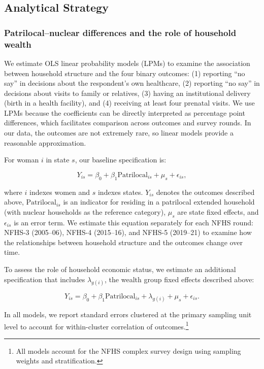 \documentclass[10pt,twoside,reqno]{article}
\begin{document}
\subsection{Analytical Strategy}
\subsubsection{Patrilocal–nuclear differences and the role of household wealth}

We estimate OLS linear probability models (LPMs) to examine the association between household structure and the four binary outcomes: (1) reporting ``no say'' in decisions about the respondent's own healthcare, (2) reporting ``no say'' in decisions about visits to family or relatives, (3) having an institutional delivery (birth in a health facility), and (4) receiving at least four prenatal visits. We use LPMs because the coefficients can be directly interpreted as percentage point differences, which facilitates comparison across outcomes and survey rounds. In our data, the outcomes are not extremely rare, so linear models provide a reasonable approximation.

For woman $i$ in state $s$, our baseline specification is:

\begin{equation} \label{eq:nocontrols}
Y_{is} = \beta_0 + \beta_1 \text{Patrilocal}_{is} + \mu_s + \epsilon_{is},
\end{equation}

where $i$ indexes women and $s$ indexes states. $Y_{is}$ denotes the outcomes described above, $\text{Patrilocal}_{is}$ is an indicator for residing in a patrilocal extended household (with nuclear households as the reference category), $\mu_s$ are state fixed effects, and $\epsilon_{is}$ is an error term. We estimate this equation separately for each NFHS round: NFHS-3 (2005--06), NFHS-4 (2015--16), and NFHS-5 (2019--21) to examine how the relationships between household structure and the outcomes change over time.

To assess the role of household economic status, we estimate an additional specification that includes $\lambda_{g(i)}$, the wealth group fixed effects described above:

\begin{equation} \label{eq:controls}
Y_{is} = \beta_0 + \beta_1 \text{Patrilocal}_{is} + \lambda_{g(i)} + \mu_s + \epsilon_{is}.
\end{equation}

In all models, we report standard errors clustered at the primary sampling unit level to account for within-cluster correlation of outcomes.\footnote{All models account for the NFHS complex survey design using sampling weights and stratification.}
\end{document}
